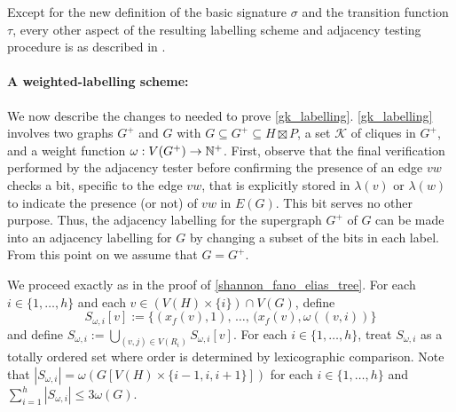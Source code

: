 \documentclass{patmorin}
\renewcommand{\le}{\leqslant}
\newcommand{\calK}{\mathcal{K}}
\begin{document}
  Except for the new definition of the basic signature $\sigma$ and the transition function $\tau$, every other aspect of the resulting labelling scheme and adjacency testing procedure is as described in \cite{dujmovic.esperet.ea:adjacency}.

  \paragraph{A weighted-labelling scheme:}
  We now describe the changes to \cite{gawrychowski.janczewski:simpler,dujmovic.esperet.ea:adjacency} needed to prove \cref{gk_labelling}.
  \cref{gk_labelling} involves two graphs $G^+$ and $G$ with $G\subseteq G^+\subseteq H\boxtimes P$, a set $\calK$ of cliques in $G^+$, and a weight function $\omega:V(G^+)\to\mathbb{N}^+$.
  First, observe that the final verification performed by the adjacency tester before confirming the presence of an edge $vw$ checks a bit, specific to the edge $vw$, that is explicitly stored in $\lambda(v)$ or $\lambda(w)$ to indicate the presence (or not) of $vw$ in $E(G)$.
  This bit serves no other purpose.  Thus, the adjacency labelling for the supergraph $G^+$ of $G$ can be made into an adjacency labelling for $G$ by changing a subset of the bits in each label.
  From this point on we assume that $G=G^+$.

  We proceed exactly as in the proof of \cref{shannon_fano_elias_tree}.
  For each $i\in\{1,\ldots,h\}$ and each $v\in (V(H)\times\{i\})\cap V(G)$, define
  \[
     S_{\omega,i}[v]:=\{(x_f(v),1),\,\ldots,\, (x_f(v),\omega((v,i))\}
  \]
  and define $S_{\omega,i}:=\bigcup_{(v,j)\in V(R_i)}S_{\omega,i}[v]$.  For each $i\in\{1,\ldots,h\}$, treat $S_{\omega,i}$ as a totally ordered set where order is determined by lexicographic comparison.  Note that $|S_{\omega,i}|=\omega(G[V(H)\times\{i-1,i,i+1\}])$ for each $i\in\{1,\ldots,h\}$ and $\sum_{i=1}^h |S_{\omega,i}|\le 3\omega(G)$.
\end{document}
